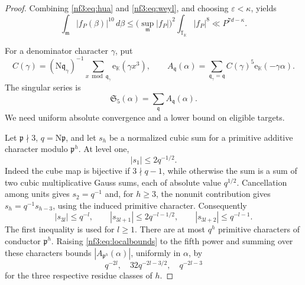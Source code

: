 \documentclass[11pt,letterpaper]{article}
\theoremstyle{definition}
\numberwithin{equation}{section}
\begin{document}
\begin{proof}
Combining \eqref{nf3:eq:hua} and \eqref{nf3:eq:weyl}, and choosing $\varepsilon<\kappa$, yields
\begin{equation}\label{nf3:eq:minor10}
 \int_{\mathfrak m}|f_P(\beta)|^{10}\,d\beta
 \le\bigl(\sup_{\mathfrak m}|f_P|\bigr)^2
       \int_{\mathbb T_{\mathbb K}}|f_P|^8
 \ll P^{7d-\kappa}.
\end{equation}


For a denominator character $\gamma$, put
\[
 C(\gamma)=(\mathrm N\mathfrak q_\gamma)^{-1}
  \sum_{x\bmod\mathfrak q_\gamma}\mathrm e_{\mathbb K}(\gamma x^3),
\qquad
 A_{\mathfrak q}(\alpha)=\sum_{\mathfrak q_\gamma=\mathfrak q}C(\gamma)^5\mathrm e_{\mathbb K}(-\gamma\alpha).
\]
The singular series is
\begin{equation}\label{nf3:eq:series}
 \mathfrak S_5(\alpha)=\sum_{\mathfrak q}A_\mathfrak q(\alpha).
\end{equation}
We need uniform absolute convergence and a lower bound on eligible targets.

Let $\mathfrak p\nmid3$, $q=\mathrm N\mathfrak p$, and let $s_h$ be a normalized cubic sum for a primitive additive character modulo $\mathfrak p^h$. At level one,
\[
 |s_1|\le2q^{-1/2}.
\]
Indeed the cube map is bijective if $3\nmid q-1$, while otherwise the sum is a sum of two cubic multiplicative Gauss sums, each of absolute value $q^{1/2}$. Cancellation among units gives $s_2=q^{-1}$ and, for $h\ge3$, the nonunit contribution gives $s_h=q^{-1}s_{h-3}$, using the induced primitive character. Consequently
\begin{equation}\label{nf3:eq:localbounds}
 |s_{3l}|\le q^{-l},\qquad
 |s_{3l+1}|\le2q^{-l-1/2},\qquad
 |s_{3l+2}|\le q^{-l-1}.
\end{equation}
The first inequality is used for $l\ge1$. There are at most $q^h$ primitive characters of conductor $\mathfrak p^h$. Raising \eqref{nf3:eq:localbounds} to the fifth power and summing over these characters bounds $|A_{\mathfrak p^h}(\alpha)|$, uniformly in $\alpha$, by
\begin{equation}\label{nf3:eq:Abounds}
 q^{-2l},\quad32q^{-2l-3/2},\quad q^{-2l-3}
\end{equation}
for the three respective residue classes of $h$.


\end{proof}
\end{document}

